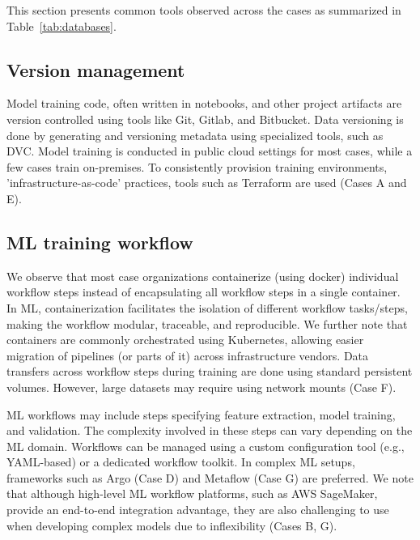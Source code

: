 This section presents common tools observed across the cases as summarized in Table~\ref{tab:databases}.



\subsection{Version management}
Model training code, often written in notebooks, and other project artifacts are version controlled using tools like Git, Gitlab, and Bitbucket. Data versioning is done by generating and versioning metadata using specialized tools, such as DVC. 
Model training is conducted in public cloud settings for most cases, while a few cases train on-premises. To consistently provision training environments, 'infrastructure-as-code' practices, tools such as Terraform are used (Cases A and E).


\subsection{ML training workflow}
We observe that most case organizations containerize (using docker) individual workflow steps instead of encapsulating all workflow steps in a single container. In ML, containerization facilitates the isolation of different workflow tasks/steps, making the workflow modular, traceable, and reproducible. We further note that containers are commonly orchestrated using Kubernetes, allowing easier migration of pipelines (or parts of it) across infrastructure vendors. Data transfers across workflow steps during training are done using standard persistent volumes. However, large datasets may require using network mounts (Case F).

ML workflows may include steps specifying feature extraction, model training, and validation. The complexity involved in these steps can vary depending on the ML domain. Workflows can be managed using a custom configuration tool (e.g., YAML-based) or a dedicated workflow toolkit. In complex ML setups, frameworks such as Argo (Case D) and Metaflow (Case G) are preferred. We note that although high-level ML workflow platforms, such as AWS SageMaker, provide an end-to-end integration advantage, they are also challenging to use when developing complex models due to inflexibility (Cases B, G).


